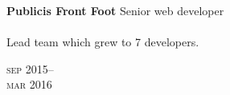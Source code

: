 
\begin{minipage}[t]{\mainboxwidth\textwidth}
\textbf{Publicis Front Foot}\phantom{..} Senior web developer \\
\\
{\small
Lead team which grew to 7 developers.
}
\\
{\small
\textit{}
\par}
\end{minipage}
\begin{minipage}[t]{\detailboxwidth\textwidth}
{
\hfill \textsc{sep} 2015--\\ 
\hspace*{0pt} \hfill \textsc{mar} 2016
\par
}
\end{minipage}


